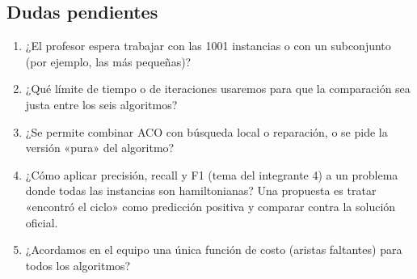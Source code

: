 \subsection{Dudas pendientes}
\begin{enumerate}[nosep]
  \item \duda{} ¿El profesor espera trabajar con las 1001 instancias o con un subconjunto
        (por ejemplo, las más pequeñas)?
  \item \duda{} ¿Qué límite de tiempo o de iteraciones usaremos para que la comparación sea
        justa entre los seis algoritmos?
  \item \duda{} ¿Se permite combinar ACO con búsqueda local o reparación, o se pide la
        versión «pura» del algoritmo?
  \item \duda{} ¿Cómo aplicar precisión, recall y F1 (tema del integrante 4) a un
        problema donde todas las instancias son hamiltonianas? Una propuesta es tratar
        «encontró el ciclo» como predicción positiva y comparar contra la solución oficial.
  \item \duda{} ¿Acordamos en el equipo una única función de costo (aristas faltantes) para
        todos los algoritmos?
\end{enumerate}

